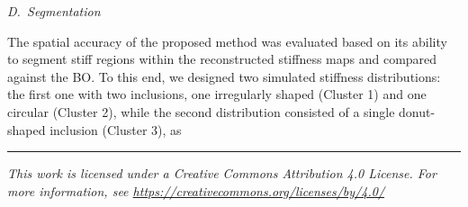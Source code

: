 \documentclass[11pt]{article}
\begin{document}
\vspace{0.6em}

\noindent\textit{D.~Segmentation}

\vspace{0.2em}

\noindent
The spatial accuracy of the proposed method was evaluated based on
its ability to segment stiff regions within the reconstructed
stiffness maps and compared against the BO. To this end, we designed
two simulated stiffness distributions: the first one with two
inclusions, one irregularly shaped (Cluster 1) and one circular
(Cluster 2), while the second distribution consisted of a single
donut-shaped inclusion (Cluster 3), as

\vfill
\hrule
\vspace{0.3em}
\begin{center}
{\footnotesize\itshape
This work is licensed under a Creative Commons Attribution 4.0
License. For more information, see
\url{https://creativecommons.org/licenses/by/4.0/}\par}
\end{center}
\end{document}
